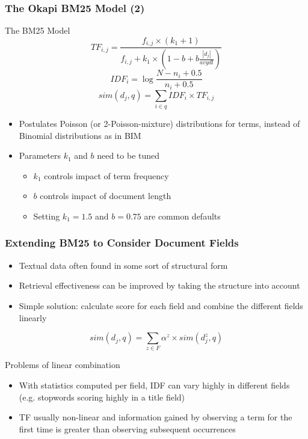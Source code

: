 \documentclass[svgnames]{beamer}
\begin{document}
\begin{frame} \frametitle{The Okapi BM25 Model (2)}
\begin{block}{The BM25 Model}
    \begin{displaymath}
          TF_{i,j} = \frac{f_{i,j} \times (k_1 + 1)}
                                  {f_{i,j} + k_1 \times \left( 1-b+b\frac{|d_j|}{avgdl} \right)}
    \end{displaymath}
    \begin{displaymath}
        IDF_i = \log\frac{N - n_i + 0.5}{n_i + 0.5}
    \end{displaymath}
    \begin{displaymath}
          sim(d_j,q) =
          \sum_{i \in q} IDF_i \times TF_{i,j} 
    \end{displaymath}
\end{block}
\begin{itemize}
\item Postulates Poisson (or 2-Poisson-mixture) distributions for terms, instead of Binomial distributions as in BIM
\item Parameters $k_1$ and $b$ need to be tuned
\begin{itemize}
\item $k_1$ controls impact of term frequency
\item $b$ controls impact of document length
\item Setting $k_1 = 1.5$ and $b = 0.75$ are common defaults
\end{itemize}
\end{itemize}
\end{frame}


\begin{frame} \frametitle{Extending BM25 to Consider Document Fields}
\begin{itemize}
\item Textual data often found in some sort of structural form
\item Retrieval effectiveness can be improved by taking the structure into account
\item Simple solution: calculate score for each field and combine the different fields linearly
\end{itemize}
    \begin{displaymath}
          sim(d_j,q) =
          \sum_{z \in F} \alpha^z \times sim(d_j^z,q)
    \end{displaymath}
\begin{block}{Problems of linear combination}
\begin{itemize}
\item With statistics computed per field, IDF can vary highly in different fields (e.g. stopwords scoring highly in a title field)
\item TF usually non-linear and information gained by observing a term for the first time is greater than observing subsequent occurrences
\end{itemize}
\end{block}
\end{frame}
\end{document}
